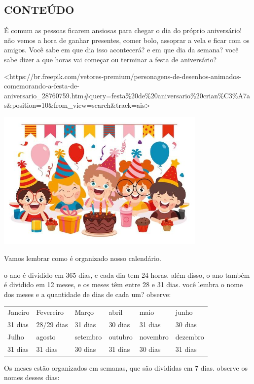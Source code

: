 \subsection{CONTEÚDO}\label{conteuxfado-3}

É comum as pessoas ficarem ansiosas para chegar o dia do próprio aniversário!
não vemos a hora de ganhar presentes, comer bolo, assoprar a vela e
ficar com os amigos. Você sabe em que dia isso acontecerá? e em que dia
da semana? você sabe dizer a que horas vai começar ou terminar a 
festa de aniversário?

\textless{}https://br.freepik.com/vetores-premium/personagens-de-desenhos-animados-comemorando-a-festa-de-aniversario\_28760759.htm\#query=festa\%20de\%20aniversario\%20crian\%C3\%A7as\&position=10\&from\_view=search\&track=ais\textgreater{}

\includegraphics[width=4.02731in,height=2.68282in]{media/image34.jpg}

Vamos lembrar como é organizado nosso calendário.

o ano é dividido em 365 dias, e cada dia tem 24 horas. além disso, o ano
também é dividido em 12 meses, e os meses têm entre 28 e 31 dias. você lembra o nome dos meses e a quantidade
de dias de cada um? observe:

\begin{longtable}[]{@{}llllll@{}}
\toprule
Janeiro & Fevereiro & Março & abril & maio & junho\tabularnewline
31 dias & 28/29 dias & 31 dias & 30 dias & 31 dias & 30 dias\tabularnewline
Julho & agosto & setembro & outubro & novembro & dezembro\tabularnewline
31 dias & 31 dias & 30 dias & 31 dias & 30 dias & 31 dias\tabularnewline
\bottomrule
\end{longtable}

Os meses estão organizados em semanas, que são divididas em 7 dias. observe os nomes
desses dias:

